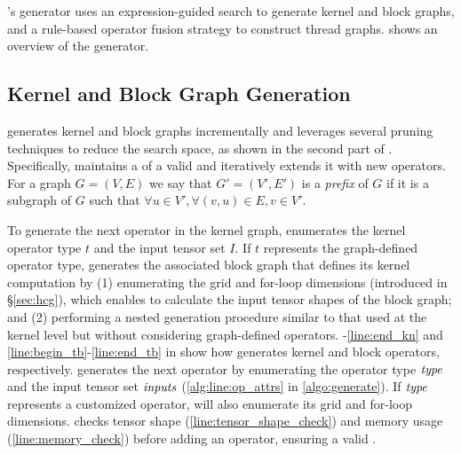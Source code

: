 \sys's \graph generator uses an expression-guided search to generate kernel and block graphs, and a rule-based operator fusion strategy to construct thread graphs.  shows an overview of the \graph generator.
\fi 

\subsection{Kernel and Block Graph Generation}
\label{subsec:kernel_block_graph_generation}
\sys generates kernel and block graphs incrementally and leverages several pruning techniques to reduce the search space, as shown in the second part of . 
%
Specifically, \sys maintains a \textit{\prefix} of a valid \graph and iteratively extends it with new operators. 
For a graph $G=(V,E)$ we say that $G'=(V',E')$ is a \emph{prefix} of $G$ if it is a subgraph of $G$ such that $\forall u \in V', \forall (v, u) \in E, v \in V'$.

To generate the next operator in the kernel graph, \sys enumerates the kernel operator type $t$ and the input tensor set $I$. If $t$ represents the graph-defined operator type, \sys  generates the associated block graph that defines its kernel computation by (1)
enumerating the grid and for-loop dimensions (introduced in \S\ref{sec:hcg}), which enables \sys to calculate the input tensor shapes of the block graph; and (2) performing a nested generation procedure similar to that used at the kernel level but without considering graph-defined operators. -\ref{line:end_kn} and \cref{line:begin_tb}-\ref{line:end_tb} in  show how \sys generates kernel and block operators, respectively.
%
\sys generates the next operator by enumerating the operator type $\mathit{type}$ and the input tensor set $\mathit{inputs}$ (\cref{alg:line:op_attrs} in \cref{algo:generate}). If $\mathit{type}$ represents a customized operator, \sys will also enumerate its grid and for-loop dimensions.
\fi
%
%
\sys checks tensor shape (\cref{line:tensor_shape_check}) and memory usage (\cref{line:memory_check}) before adding an operator, ensuring a valid \prefix.

